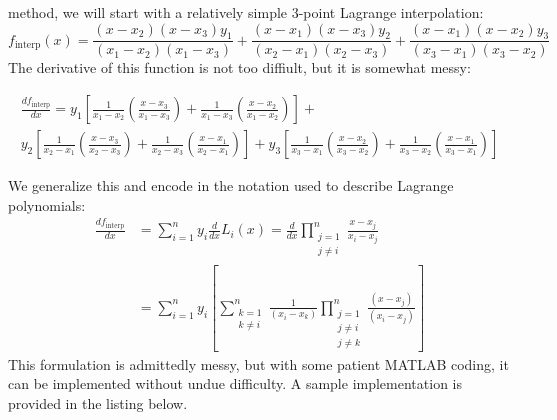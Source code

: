  method, we will start with a relatively simple 3-point Lagrange interpolation:
\begin{equation*}
f_{\text{interp}}(x) = \frac{(x - x_2)(x - x_3)y_1}{(x_1 - x_2)(x_1 - x_3)} + \frac{(x - x_1)(x-x_3)y_2}{(x_2 - x_1)(x_2 - x_3)} + \frac{(x - x_1)(x-x_2)y_3}{(x_3-x_1)(x_3 - x_2)}
\end{equation*}
The derivative of this function is not too diffiult, but it is somewhat messy:
\begin{fullwidth}
\begin{multline*}
\frac{df_{\text{interp}}}{dx} = y_1\left[\frac{1}{x_1 - x_2}\left(\frac{x - x_3}{x_1 - x_3}\right) + \frac{1}{x_1-x_3}\left(\frac{x - x_2}{x_1 - x_2} \right)\right] + \\ y_2\left[\frac{1}{x_2 - x_1}\left(\frac{x - x_3}{x_2 - x_3}\right) + \frac{1}{x_2 - x_3}\left(\frac{x - x_1}{x_2 - x_1}\right) \right] + y_3 \left[\frac{1}{x_3 - x_1}\left(\frac{x - x_2}{x_3 - x_2}\right) + \frac{1}{x_3 - x_2}\left(\frac{x - x_1}{x_3 - x_1}\right) \right]
\end{multline*}
\end{fullwidth}
We generalize this and encode in the notation used to describe Lagrange polynomials:
\begin{align}
\frac{df_{\text{interp}}}{dx} &= \sum\limits_{i=1}^{n}y_i \frac{d}{dx}L_{i}(x) = \frac{d}{dx}\prod_{\substack{j=1 \\ j \ne i}}^{n} \frac{x - x_j}{x_i - x_j} \\ \nonumber
&= \sum\limits_{i=1}^{n}y_i\left[\sum\limits_{\substack{k = 1 \\ k \ne i}}^{n}\frac{1}{\left(x_i - x_k\right)} \prod_{\substack{j=1 \\ j \ne i \\ j \ne k}}^{n} \frac{\left(x - x_j\right)}{\left(x_i - x_j\right)} \right]
\end{align}
This formulation is admittedly messy, but with some patient MATLAB coding, it can be implemented without undue difficulty. A sample implementation is provided in the listing below.
